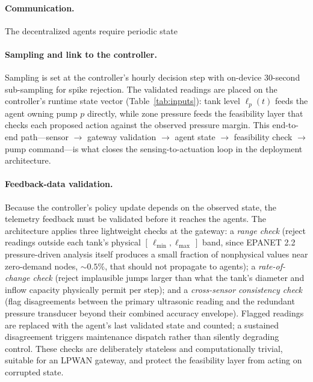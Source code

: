 \documentclass[11pt,a4paper]{article}
\begin{document}
\paragraph{Communication.} The decentralized agents require periodic state

\paragraph{Sampling and link to the controller.} Sampling is set at the
controller's hourly decision step with on-device $30$-second sub-sampling for
spike rejection. The validated readings are placed on the controller's runtime
state vector (Table~\ref{tab:inputs}): tank level $\ell_p(t)$ feeds the agent
owning pump $p$ directly, while zone pressure feeds the feasibility layer that
checks each proposed action against the observed pressure margin. This
end-to-end path---sensor $\to$ gateway validation $\to$ agent state $\to$
feasibility check $\to$ pump command---is what closes the sensing-to-actuation
loop in the deployment architecture.

\paragraph{Feedback-data validation.} Because the controller's policy update
depends on the observed state, the telemetry feedback must be validated before it
reaches the agents. The architecture applies three lightweight checks at the
gateway: a \emph{range check} (reject readings outside each tank's physical
$[\,\ell_{\min},\ell_{\max}\,]$ band, since EPANET 2.2 pressure-driven analysis
itself produces a small fraction of nonphysical values near zero-demand nodes,
${\sim}0.5\%$, that should not propagate to agents); a \emph{rate-of-change
check} (reject implausible jumps larger than what the tank's diameter and inflow
capacity physically permit per step); and a \emph{cross-sensor consistency check}
(flag disagreements between the primary ultrasonic reading and the redundant
pressure transducer beyond their combined accuracy envelope). Flagged readings
are replaced with the agent's last validated state and counted; a sustained
disagreement triggers maintenance dispatch rather than silently degrading
control. These checks are deliberately stateless and computationally trivial,
suitable for an LPWAN gateway, and protect the feasibility layer from acting on
corrupted state.
\end{document}
